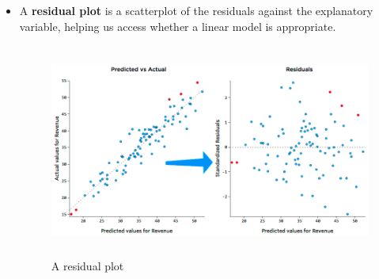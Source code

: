 \documentclass[Main.tex]{subfiles}
\begin{document}
\begin{exercise}
\begin{itemize}
			\item A \textbf{residual plot} is a scatterplot of the residuals against the explanatory variable, helping us access whether a linear model is appropriate.	
			
			\begin{figure}[H]
				\centering
				\includegraphics[height=7cm,width=14cm]{residualplot}
				\caption{A residual plot}
				\label{residual plot}
			\end{figure}			
		\end{itemize}
	\end{exercise} \hfill
	
\end{document}
